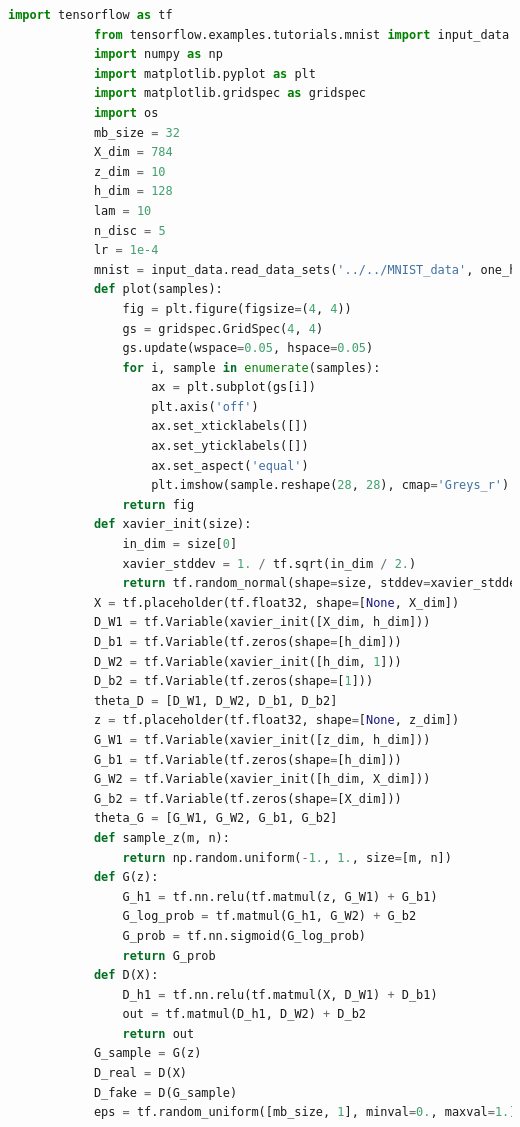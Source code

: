             \begin{lstlisting}[language = Python]
            import tensorflow as tf
            from tensorflow.examples.tutorials.mnist import input_data
            import numpy as np
            import matplotlib.pyplot as plt
            import matplotlib.gridspec as gridspec
            import os
            mb_size = 32
            X_dim = 784
            z_dim = 10
            h_dim = 128
            lam = 10
            n_disc = 5
            lr = 1e-4
            mnist = input_data.read_data_sets('../../MNIST_data', one_hot=True)
            def plot(samples):
                fig = plt.figure(figsize=(4, 4))
                gs = gridspec.GridSpec(4, 4)
                gs.update(wspace=0.05, hspace=0.05)
                for i, sample in enumerate(samples):
                    ax = plt.subplot(gs[i])
                    plt.axis('off')
                    ax.set_xticklabels([])
                    ax.set_yticklabels([])
                    ax.set_aspect('equal')
                    plt.imshow(sample.reshape(28, 28), cmap='Greys_r')
                return fig
            def xavier_init(size):
                in_dim = size[0]
                xavier_stddev = 1. / tf.sqrt(in_dim / 2.)
                return tf.random_normal(shape=size, stddev=xavier_stddev)
            X = tf.placeholder(tf.float32, shape=[None, X_dim])
            D_W1 = tf.Variable(xavier_init([X_dim, h_dim]))
            D_b1 = tf.Variable(tf.zeros(shape=[h_dim]))
            D_W2 = tf.Variable(xavier_init([h_dim, 1]))
            D_b2 = tf.Variable(tf.zeros(shape=[1]))
            theta_D = [D_W1, D_W2, D_b1, D_b2]
            z = tf.placeholder(tf.float32, shape=[None, z_dim])
            G_W1 = tf.Variable(xavier_init([z_dim, h_dim]))
            G_b1 = tf.Variable(tf.zeros(shape=[h_dim]))
            G_W2 = tf.Variable(xavier_init([h_dim, X_dim]))
            G_b2 = tf.Variable(tf.zeros(shape=[X_dim]))
            theta_G = [G_W1, G_W2, G_b1, G_b2]
            def sample_z(m, n):
                return np.random.uniform(-1., 1., size=[m, n])
            def G(z):
                G_h1 = tf.nn.relu(tf.matmul(z, G_W1) + G_b1)
                G_log_prob = tf.matmul(G_h1, G_W2) + G_b2
                G_prob = tf.nn.sigmoid(G_log_prob)
                return G_prob
            def D(X):
                D_h1 = tf.nn.relu(tf.matmul(X, D_W1) + D_b1)
                out = tf.matmul(D_h1, D_W2) + D_b2
                return out
            G_sample = G(z)
            D_real = D(X)
            D_fake = D(G_sample)
            eps = tf.random_uniform([mb_size, 1], minval=0., maxval=1.)

\end{lstlisting}
